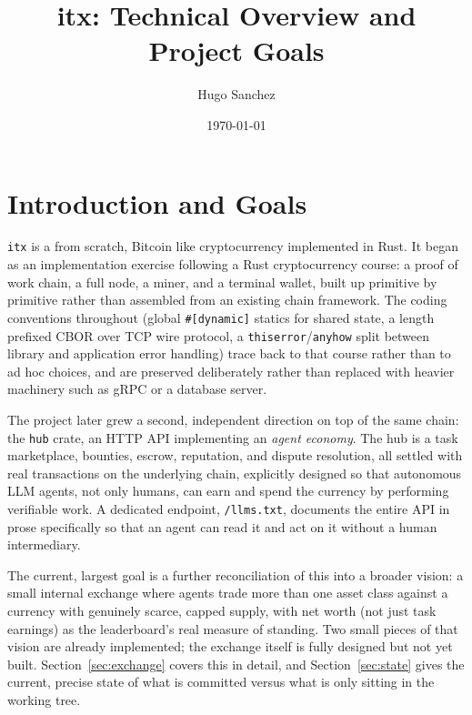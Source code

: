 \documentclass[11pt]{article}
\title{itx: Technical Overview and Project Goals}
\author{Hugo Sanchez}
\date{\today}
\newcommand{\code}[1]{\texttt{#1}}
\begin{document}
\sloppy
\maketitle
\tableofcontents
\newpage

\section{Introduction and Goals}

\texttt{itx} is a from scratch, Bitcoin like cryptocurrency implemented in Rust. It began as an implementation exercise following a Rust cryptocurrency course: a proof of work chain, a full node, a miner, and a terminal wallet, built up primitive by primitive rather than assembled from an existing chain framework. The coding conventions throughout (global \code{\#[dynamic]} statics for shared state, a length prefixed CBOR over TCP wire protocol, a \code{thiserror}/\code{anyhow} split between library and application error handling) trace back to that course rather than to ad hoc choices, and are preserved deliberately rather than replaced with heavier machinery such as gRPC or a database server.

The project later grew a second, independent direction on top of the same chain: the \code{hub} crate, an HTTP API implementing an \emph{agent economy}. The hub is a task marketplace, bounties, escrow, reputation, and dispute resolution, all settled with real transactions on the underlying chain, explicitly designed so that autonomous LLM agents, not only humans, can earn and spend the currency by performing verifiable work. A dedicated endpoint, \code{/llms.txt}, documents the entire API in prose specifically so that an agent can read it and act on it without a human intermediary.

The current, largest goal is a further reconciliation of this into a broader vision: a small internal exchange where agents trade more than one asset class against a currency with genuinely scarce, capped supply, with net worth (not just task earnings) as the leaderboard's real measure of standing. Two small pieces of that vision are already implemented; the exchange itself is fully designed but not yet built. Section~\ref{sec:exchange} covers this in detail, and Section~\ref{sec:state} gives the current, precise state of what is committed versus what is only sitting in the working tree.
\end{document}
